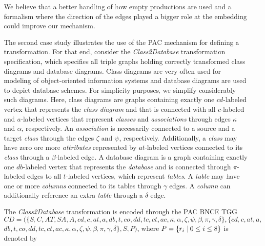 We believe that a better handling of how empty productions are used and a formalism where the direction of the edges played a bigger role at the embedding could improve our mechanism.


The second case study illustrates the use of the PAC mechanism for defining a transformation. For that end, consider the \emph{Class2Database} transformation specification, which specifies all triple graphs holding correctly transformed class diagrams and database diagrams. Class diagrams are very often used for modeling of object-oriented information systems and database diagrams are used to depict database schemes. For simplicity purposes, we simplify considerably such diagrams. Here, class diagrams are graphs containing exactly one $cd$-labeled vertex that represents the \emph{class diagram} and that is connected with all $c$-labeled and $a$-labeled vertices that represent \emph{classes} and \emph{associations} through edges $\kappa$ and $\alpha$, respectively. An \emph{association} is necessarily connected to a source and a target \emph{class} through the edges $\zeta$ and $\psi$, respectively. Additionally, a \emph{class} may have zero ore more \emph{attributes} represented by $at$-labeled vertices connected to its \emph{class} through a $\beta$-labeled edge. A database diagram is a graph containing exactly one $db$-labeled vertex that represents the \emph{database} and is connected through $\pi$-labeled edges to all $t$-labeled vertices, which represent \emph{tables}. A \emph{table} may have one or more \emph{columns} connected to its tables through $\gamma$ edges. A \emph{column} can additionally reference an extra \emph{table} through a $\delta$ edge.

The \emph{Class2Database} transformation is encoded through the PAC BNCE TGG $CD = (\{S, C, AT, SA, A, cd, c, at, a, db, t, co, dd, tc, ct, ac, \kappa, \alpha, \zeta, \psi, \beta, \pi, \gamma, \delta\}, \{cd, c, at, a, $ $ db, t, co, dd, tc, ct, ac, \kappa, \alpha, \zeta, \psi, \beta, \pi, \gamma, \delta\}, S, P)$, where $P = \{r_i \; | \; 0 \le i \le 8\}$ is denoted by\\



